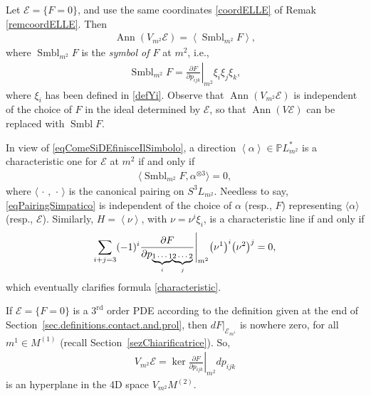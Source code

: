 \documentclass[pdftex]{sigma}
\newcommand{\E}{\mathcal{E}}
\newcommand{\Ann}{\operatorname{Ann}}
\newcommand{\Span}[1]{\left\langle #1 \right\rangle}
\renewcommand{\P}{\mathbb{P}}
\newcommand{\Rd}{^\textrm{rd}}
\newcommand{\w}{\nu}
\newcommand{\elle}{H}
\numberwithin{equation}{section}
\begin{document}
\begin{Remark}\label{remSimboloSimboloso}
Let $\E=\{ F=0\}$, and use the same coordinates \eqref{coordELLE} of Remak \ref{remcoordELLE}. Then
 \begin{gather*}%
\Ann(V_{m^2}\E ) = \Span{ \operatorname{Smbl}_{m^2}{F} },
\end{gather*}
where $\operatorname{Smbl}_{m^2}{F}$ is the \emph{symbol of $F$} at $m^2$, i.e.,
\begin{gather}\label{simbcordF}
\operatorname{Smbl}_{m^2}{F}=\left.\frac{\partial F}{\partial p_{ijk}}\right|_{m^2}\xi_i\xi_j\xi_k,
\end{gather}
where $\xi_i$ has been def\/ined in \eqref{defYi}.
Observe that $\Ann(V_{m^2}\E ) $ is independent of the choice of $F$ in the ideal determined by $\E$, so that $\Ann(V\E)$ can be replaced with $\operatorname{Smbl} {F}$.
\end{Remark}

In view of \eqref{eqComeSiDEfinisceIlSimbolo}, a direction $\Span{\alpha}\in \P L_{m^2}^\ast$ is a characteristic one for $\E$ at $m^2$ if and only if
 \begin{gather}\label{eqPairingSimpatico}
\big\langle \operatorname{Smbl}_{m^2}{F}, \alpha^{\otimes 3} \big\rangle=0,
\end{gather}
where $\langle \,\cdot\, ,\, \cdot\, \rangle$ is the canonical pairing on $S^3L_{m^2}$. Needless to say, \eqref{eqPairingSimpatico} is independent of the choice of $\alpha$ (resp., $F$) representing $\langle\alpha\rangle$ (resp., $\E$). Similarly, $\elle=\Span{\w}$, with $\w=\w^i\xi_i$, is a characteristic line if and only if
\begin{gather*}
 \sum_{i+j=3} (-1)^i \frac{\partial F }{\partial p_{\text{\scriptsize $\underbrace{1\cdots 1}_{i}$} \text{\scriptsize $\underbrace{2\cdots 2}_{j}$}}} \Bigg|_{ {m}^{2}}\big(\w^1\big)^i\big(\w^2\big)^j =0,
\end{gather*}
which eventually clarif\/ies formula \eqref{characteristic}.

\begin{Remark}[coordinates of $V\E$]
If $\E=\{F=0\}$ is a $3\Rd$ order PDE according to the def\/inition given at the end of Section~\ref{sec.definitions.contact.and.prol}, then $dF|_{\E_{m^1}}$ is nowhere zero, for all $m^1\in M^{(1)}$ (recall Section~\ref{sezChiarificatrice}). So,
 \begin{gather*}%
V_{m^2}\E = \ker \left.\frac{\partial F}{\partial p_{ijk}}\right|_{m^2}dp_{ijk}
\end{gather*}
is an hyperplane in the 4D space $V_{m^2}M^{(2)}$.
\end{Remark}
\end{document}
